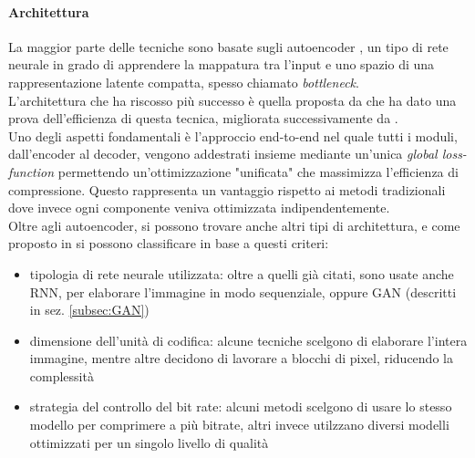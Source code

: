 \paragraph{Architettura}La maggior parte delle tecniche sono basate sugli autoencoder \cite{theis2017lossy}, un tipo di rete neurale in grado di apprendere la mappatura tra l'input e uno spazio di una rappresentazione latente compatta, spesso chiamato \textit{bottleneck}.\\
L'architettura che ha riscosso più successo è quella proposta da \cite{balle2018variational} che ha dato una prova dell'efficienza di questa tecnica, migliorata successivamente da \cite{minnen2018joint}.\\
Uno degli aspetti fondamentali è l'approccio end-to-end nel quale tutti i moduli, dall'encoder al decoder, vengono addestrati insieme mediante un'unica \textit{global loss-function} permettendo un'ottimizzazione "unificata" che massimizza l'efficienza di compressione. Questo rappresenta un vantaggio rispetto ai metodi tradizionali dove invece ogni componente veniva ottimizzata indipendentemente.\\
Oltre agli autoencoder, si possono trovare anche altri tipi di architettura, e come proposto in \cite{ascenso2019report} si possono classificare in base a questi criteri:
\begin{itemize}
    \item tipologia di rete neurale utilizzata: oltre a quelli già citati, sono usate anche RNN, per elaborare l'immagine in modo sequenziale, oppure GAN (descritti in sez. \ref{subsec:GAN})
    \item dimensione dell'unità di codifica: alcune tecniche scelgono di elaborare l'intera immagine, mentre altre decidono di lavorare a blocchi di pixel, riducendo la complessità
    \item strategia del controllo del bit rate: alcuni metodi scelgono di usare lo stesso modello per comprimere a più bitrate, altri invece utilzzano diversi modelli ottimizzati per un singolo livello di qualità
\end{itemize}
